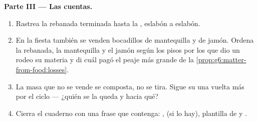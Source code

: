 \begin{problem}
\medskip\noindent\textbf{Parte III --- Las cuentas.}
\begin{enumerate}[resume]
  \item Rastrea la rebanada terminada hasta la , eslabón a eslabón.
  \item En la fiesta también se venden bocadillos de mantequilla y de
        jamón. Ordena la rebanada, la mantequilla y el jamón según los
        pisos por los que dio un rodeo su materia y di cuál pagó el
        peaje más grande de la \cref{prop:g6:matter-from-food:losses}.
  \item La masa que no se vende se composta, no se tira. Sigue su
         una vuelta más por el ciclo --- ¿quién se la
        queda y hacia qué?
  \item Cierra el cuaderno con una frase que contenga: ,
         (si lo hay), plantilla de  y .
\end{enumerate}
\end{problem}
